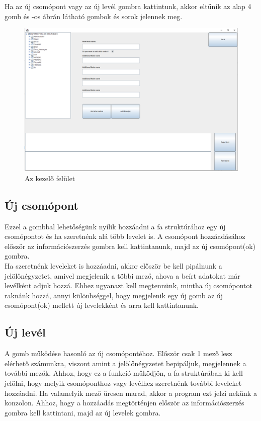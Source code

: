 Ha az új csomópont vagy az új levél gombra kattintunk, akkor eltűnik az alap 4 gomb és -os ábrán látható gombok és sorok jelennek meg.

\begin{figure} [H]
	\centering
	\includegraphics[width=.9\textwidth]{images/modify_screen.png}
	\caption{Az kezelő felület}
	\label{fig:modify_screen}
\end{figure}

\subsection{Új csomópont} Ezzel a gombbal lehetőségünk nyílik hozzáadni a fa struktúrához egy új csomópontot és ha szeretnénk alá több levelet is. A csomópont hozzáadásához először az információszerzés gombra kell kattintanunk, majd az új csomópont(ok) gombra.\\
Ha szeretnénk leveleket is hozzáadni, akkor először be kell pipálnunk a jelölőnégyzetet, amivel megjelenik a többi mező, ahova a beírt adatokat már levélként adjuk hozzá. Ehhez ugyanazt kell megtennünk, mintha új csomópontot raknánk hozzá, annyi különbséggel, hogy megjelenik egy új gomb az új csomópont(ok) mellett új levelekként és arra kell kattintanunk. 

\subsection{Új levél} A gomb működése hasonló az új csomópontéhoz. Először csak 1 mező lesz elérhető számunkra, viszont amint a jelölőnégyzetet bepipáljuk, megjelennek a további mezők. Ahhoz, hogy ez a funkció működjön, a fa struktúrában ki kell jelölni, hogy melyik csomóponthoz vagy levélhez szeretnénk további leveleket hozzáadni. Ha valamelyik mező üresen marad, akkor a program ezt jelzi nekünk a konzolon. Ahhoz, hogy a hozzáadás megtörténjen először az információszerzés gombra kell kattintani, majd az új levelek gombra.


